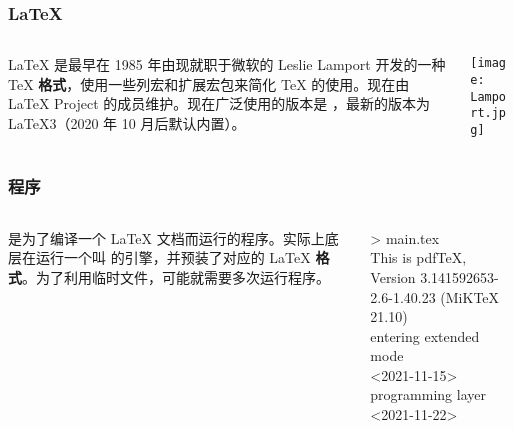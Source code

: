 \begin{frame}
  \frametitle{\LaTeX{}}
  \begin{columns}[c]
    \begin{column}{0.7\textwidth}
      \begin{center}
        \rmfamily\Huge
        \highlight[structure]{\LaTeX{}}
      \end{center}
      \begin{center}
        \parbox{0.75\textwidth}{
          \LaTeX{} 是最早在 1985 年由现就职于微软的 Leslie Lamport 开发的一种 \TeX{} \textbf{格式}\footnotemark，使用一些列宏和扩展宏包来简化 \TeX{} 的使用。现在由 \LaTeX{} Project 的成员维护。现在广泛使用的版本是 \LaTeXe{}，最新的版本为 \LaTeX3（2020 年 10 月后默认内置）。
        }
      \end{center}
    \end{column}
    \begin{column}{0.3\textwidth}
      \texttt{[image: Lamport.jpg]}
    \end{column}
  \end{columns}
\end{frame}

\begin{frame}
  \frametitle{程序}
  \begin{columns}[c]
    \begin{column}{0.7\textwidth}
      \begin{center}
        \rmfamily\Huge
      \end{center}
      \begin{center}
        \parbox{0.7\textwidth}{
           是为了编译一个 \LaTeX{} 文档而运行的程序。实际上底层在运行一个叫  的引擎，并预装了对应的 \LaTeX{} \textbf{格式}。为了利用临时文件，可能就需要多次运行程序。
        }
      \end{center}
    \end{column}
    \begin{column}{0.3\textwidth}
      \begin{block}{}
        \ttfamily\small
        >  main.tex\\
        This is pdfTeX, Version 3.141592653-
        2.6-1.40.23 (MiKTeX 21.10)\\
        entering extended mode\\
         <2021-11-15>\\
         programming layer <2021-11-22>
      \end{block}
    \end{column}
  \end{columns}
\end{frame}

